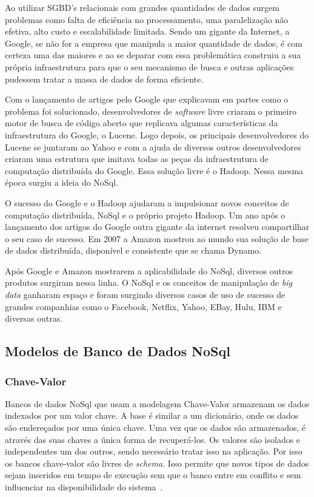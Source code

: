 Ao utilizar SGBD's relacionais com grandes quantidades de dados surgem problemas como falta de eficiência no processamento, uma paralelização não efetiva, alto custo e escalabilidade limitada. Sendo um gigante da Internet, a Google,  se não for a empresa que manipula a maior quantidade de dados, é com certeza uma das maiores e ao se deparar com essa problemática  construiu a sua própria infraestrutura para que o seu mecanismo de busca e outras aplicações pudessem tratar a massa de dados de forma eficiente.

Com o lançamento de artigos pelo Google que explicavam em partes como o problema foi solucionado, desenvolvedores de \textit{software} livre criaram o primeiro motor de busca de código aberto que replicava algumas características da infraestrutura do Google, o Lucene. Logo depois, os principais desenvolvedores do Lucene se juntaram ao Yahoo e com a ajuda de diversos outros desenvolvedores criaram uma estrutura que imitava todas as peças da infraestrutura de computação distribuída do 
Google. Essa solução livre é o Hadoop. Nessa mesma época surgiu a ideia do NoSql. 

O sucesso do Google e o Hadoop ajudaram a impulsionar novos conceitos de computação distribuída, NoSql e o próprio projeto Hadoop. Um ano após o lançamento dos artigos do Google outra gigante da internet resolveu compartilhar o seu caso de sucesso. Em 2007 a Amazon mostrou ao mundo sua solução de base de dados distribuída, disponível e consistente que se chama Dynamo.

Após Google e Amazon mostrarem a aplicabilidade do NoSql, diversos
outros produtos surgiram nessa linha. O NoSql e os conceitos de manipulação de \textit{big data} ganharam espaço e foram surgindo diversos casos de uso de sucesso de grandes companhias como o Facebook, Netflix, Yahoo, EBay, Hulu, IBM e diversas outras.


\subsection{Modelos de Banco de Dados NoSql}


\subsubsection{Chave-Valor}

Bancos de dados NoSql que usam a modelagem Chave-Valor armazenam os dados indexados por um valor chave. A base é similar a um dicionário, onde os dados são endereçados por uma única chave. Uma vez que os dados são armazenados, é através das suas chaves a única forma de recuperá-los. Os valores são isolados e independentes um dos outros, sendo necessário tratar isso na aplicação. Por isso os bancos chave-valor são livres de \textit{schema}. Isso permite que novos tipos de dados sejam inseridos em tempo de execução sem que o banco entre em conflito e sem influenciar na disponibilidade do sistema~\cite{nosqlevaluation,nosqlliveup}.


